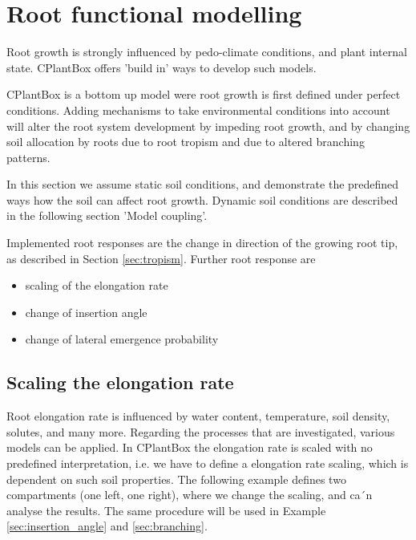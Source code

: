 \newpage
\section{Root functional modelling}

Root growth is strongly influenced by pedo-climate conditions, and plant internal state. CPlantBox offers 'build in' ways to develop such models. 

CPlantBox is a bottom up model were root growth is first defined under perfect conditions. Adding mechanisms to take environmental conditions into account will alter the root system development by impeding root growth, and by changing soil allocation by roots due to root tropism and due to altered branching patterns.

In this section we assume static soil conditions, and demonstrate the predefined ways how the soil can affect root growth.
Dynamic soil conditions are described in the following section 'Model coupling'. 

Implemented root responses are the change in direction of the growing root tip, as described in Section \ref{sec:tropism}.
Further root response are 
\begin{itemize}
 \item scaling of the elongation rate 
 \item change of insertion angle
 \item change of lateral emergence probability
\end{itemize}

\subsection{Scaling the elongation rate} \label{sec:elongation}

Root elongation rate is influenced by water content, temperature, soil density, solutes, and many more. Regarding the processes that are investigated, various models can be applied. In CPlantBox the elongation rate is scaled with no predefined interpretation, i.e. we have to define a elongation rate scaling, which is dependent on such soil properties. The following example defines two compartments (one left, one right), where we change the scaling, and ca´n analyse the results. The same procedure will be used in Example \ref{sec:insertion_angle} and \ref{sec:branching}.



